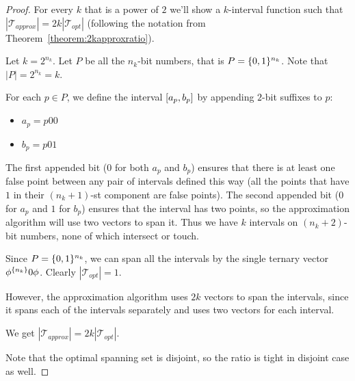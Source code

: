 \begin{proof}
For every $k$ that is a power of $2$
we'll show a $k$-interval function such that
$|\mathcal{T}_{approx}| = 2k |\mathcal{T}_{opt}|$
(following the notation from
Theorem~\ref{theorem:2kapproxratio}).

Let $k = 2^{n_k}$.
Let $P$ be all the $n_k$-bit numbers,
that is $P = \{0, 1\}^{n_k}$.
Note that $|P| = 2^{n_k} = k$.

For each $p \in P$,
we define the interval $[a_p, b_p]$
by appending $2$-bit suffixes to $p$:

\begin{itemize}
\item $a_p = p 0 0$
\item $b_p = p 0 1$
\end{itemize}

The first appended bit ($0$ for both $a_p$ and $b_p$)
ensures that there is at least one false point
between any pair of intervals defined this way
(all the points that have $1$ in their $(n_k + 1)$-st
component are false points).
The second appended bit ($0$ for $a_p$ and $1$ for $b_p$)
ensures that the interval has two points,
so the approximation algorithm will use two vectors
to span it.
Thus we have $k$ intervals
on $(n_k + 2)$-bit numbers,
none of which intersect or touch.

Since $P = \{0, 1\}^{n_k}$,
we can span all the intervals by the single ternary vector
$\phi^{\{n_k\}} 0 \phi$.
Clearly $|\mathcal{T}_{opt}| = 1$.

However,
the approximation algorithm uses $2k$ vectors to span
the intervals,
since it spans each of the intervals separately
and uses two vectors for each interval.

We get
$|\mathcal{T}_{approx}| = 2k |\mathcal{T}_{opt}|$.

Note that the optimal spanning set is disjoint,
so the ratio is tight in disjoint case as well.
\end{proof}
